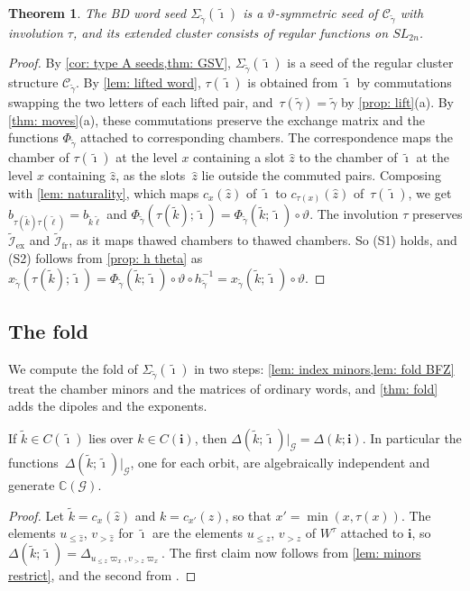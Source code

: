 \documentclass[a4paper]{amsart}
\numberwithin{equation}{section}
\newtheorem{theorem}{Theorem}[section]
\theoremstyle{definition}
\theoremstyle{remark}
\newcommand{\bbC}{\mathbb{C}}
\newcommand{\mcG}{\mathcal{G}}
\newcommand{\mcC}{\mathcal{C}}
\newcommand{\mcI}{\mathcal{I}}
\newcommand{\bfi}{\mathbf{i}}
\newcommand{\tbfi}{\widetilde{\boldsymbol{\imath}}}
\newcommand{\tg}{\widetilde{\gamma}}
\newcommand{\vt}{\vartheta}
\newcommand{\ex}{\mathrm{ex}}
\newcommand{\fr}{\mathrm{fr}}
\newcommand{\SL}{SL_{2n}}
\begin{document}
\begin{theorem}
  \label{thm: symmetric}
  The BD word seed $\Sigma_{\tg}(\tbfi)$ is a $\vt$-symmetric seed of $\mcC_{\tg}$ with involution $\tau$, and its extended cluster consists of regular functions on $\SL$.
\end{theorem}
\begin{proof}
  By \cref{cor: type A seeds,thm: GSV}, $\Sigma_{\tg}(\tbfi)$ is a seed of the regular cluster structure $\mcC_{\tg}$.
  By \cref{lem: lifted word}, $\tau(\tbfi)$ is obtained from $\tbfi$ by commutations swapping the two letters of each lifted pair, and~$\tau(\tg)=\tg$ by \cref{prop: lift}(a).
  By \cref{thm: moves}(a), these commutations preserve the exchange matrix and the functions $\Phi_{\tg}$ attached to corresponding chambers.
  The correspondence maps the chamber of $\tau(\tbfi)$ at the level $x$ containing a slot $\widehat z$ to the chamber of $\tbfi$ at the level $x$ containing $\widehat z$, as the slots~$\widehat z$ lie outside the commuted pairs.
  Composing with \cref{lem: naturality}, which maps $c_x(\widehat z)$ of $\tbfi$ to $c_{\tau(x)}(\widehat z)$ of~$\tau(\tbfi)$, we get $b_{\tau(\widetilde{k})\tau(\widetilde{\ell})}=b_{\widetilde{k}\widetilde{\ell}}$ and $\Phi_{\tg}(\tau(\widetilde{k});\tbfi)=\Phi_{\tg}(\widetilde{k};\tbfi)\circ\vt$.
  The involution $\tau$ preserves $\widetilde{\mcI}_\ex$ and $\widetilde{\mcI}_\fr$, as it maps thawed chambers to thawed chambers.
  So (S1) holds, and (S2) follows from \cref{prop: h theta} as~$x_{\tg}(\tau(\widetilde{k});\tbfi)=\Phi_{\tg}(\widetilde{k};\tbfi)\circ\vt\circ h_{\tg}^{-1}=x_{\tg}(\widetilde{k};\tbfi)\circ\vt$.
\end{proof}

\subsection{The fold}
We compute the fold of $\Sigma_{\tg}(\tbfi)$ in two steps: \cref{lem: index minors,lem: fold BFZ} treat the chamber minors and the matrices of ordinary words, and \cref{thm: fold} adds the dipoles and the exponents.

\begin{lemma}
  \label{lem: index minors}
  If $\widetilde{k}\in C(\tbfi)$ lies over $k\in C(\bfi)$, then $\Delta(\widetilde{k};\tbfi)|_\mcG=\Delta(k;\bfi)$.
  In particular the functions~$\Delta(\widetilde{k};\tbfi)|_\mcG$, one for each orbit, are algebraically independent and generate $\bbC(\mcG)$.
\end{lemma}
\begin{proof}
  Let $\widetilde{k}=c_x(\widehat z)$ and $k=c_{x'}(z)$, so that $x'=\min(x,\tau(x))$.
  The elements $u_{\le\widehat z}$, $v_{>\widehat z}$ for $\tbfi$ are the elements $u_{\le z}$, $v_{>z}$ of $W^\tau$ attached to $\bfi$, so $\Delta(\widetilde{k};\tbfi)=\Delta_{u_{\le z}\varpi_x,v_{>z}\varpi_x}$.
  The first claim now follows from \cref{lem: minors restrict}, and the second from \cite[Theorem~2.10]{BFZ05}.
\end{proof}
\end{document}
